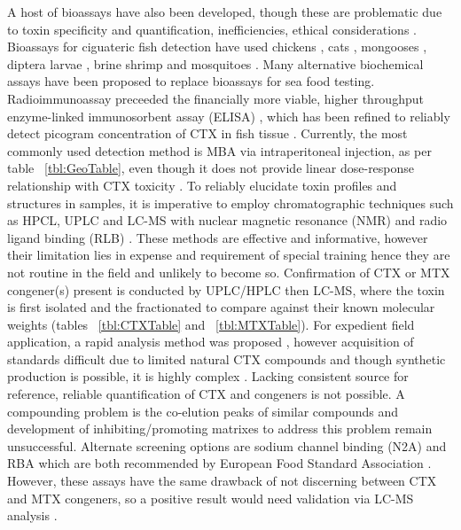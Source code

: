 \documentclass[12pt]{article}
\begin{document}
A host of bioassays have also been developed, though these are problematic due to toxin specificity and quantification, inefficiencies, ethical considerations \cite{dickey2010ciguatera}.
Bioassays for ciguateric fish detection have used chickens \cite{}, cats \cite{larson1967ciguatera}, mongooses \cite{hokama1977radioimmunoassay}, diptera larvae \cite{labrousse1996toxicological}, brine shrimp \cite{granade1976ciguatera} and mosquitoes \cite{bagnis1987use}.
Many alternative biochemical assays have been proposed to replace bioassays for sea food testing. Radioimmunoassay \cite{hokama1977radioimmunoassay} preceeded the financially more viable, higher throughput enzyme-linked immunosorbent assay (ELISA) \cite{hokama1983rapid}, which has been refined to reliably detect picogram concentration of CTX in fish tissue \cite{campora2008detection,campora2010evaluating}. Currently, the most commonly used detection method is MBA via intraperitoneal injection, as per table ~\ref{tbl:GeoTable}, even though it does not provide linear dose-response relationship with CTX toxicity \cite{hoffman1983mouse}. 
To reliably elucidate toxin profiles and structures in samples, it is imperative to employ chromatographic techniques such as HPCL, UPLC and LC-MS with nuclear magnetic resonance (NMR) \cite{legrand1989isolation,murata1990structures,murata1990structures,satake1996isolation,diogened2014chemistry} and radio ligand binding (RLB) \cite{hamilton2002multiple,hamilton2002isolation}. These methods are effective and informative, however their limitation lies in expense and requirement of special training hence they are not routine in the field and unlikely to become so. %
Confirmation of CTX or MTX congener(s) present is conducted by UPLC/HPLC then LC-MS, where the toxin is first isolated and the fractionated to compare against their known molecular weights (tables ~\ref{tbl:CTXTable} and ~\ref{tbl:MTXTable}). For expedient field application, a rapid analysis method was proposed \cite{lewis2009rapid}, however acquisition of standards difficult due to limited natural CTX compounds \cite{berdalet2012global} and though synthetic production is possible, it is highly complex \cite{hirama2001total}. Lacking consistent source for reference, reliable quantification of CTX and congeners is not possible. A compounding problem is the co-elution peaks of similar compounds and development of inhibiting/promoting matrixes to address this problem remain unsuccessful.
Alternate screening options are sodium channel binding (N2A) \cite{dickey2010ciguatera} and RBA \cite{poli1997identification,darius2007ciguatera} which are both recommended by European Food Standard Association \cite{}. %
However, these assays have the same drawback of not discerning between CTX and MTX congeners, so a positive result would need validation via LC-MS analysis \cite{diogened2014chemistry}. 
\end{document}
